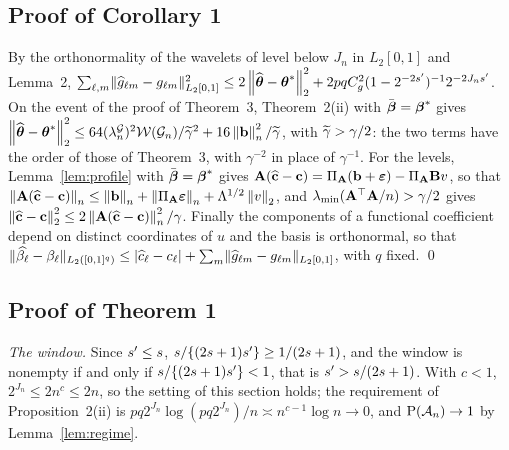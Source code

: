\subsection*{Proof of Corollary 1}

By the orthonormality of the wavelets of level below $J_n$ in $L_2[0,1]$ and
Lemma~2,
$\sum_{\ell,m}\lVert\widehat{g}_{\ell m}-g_{\ell m}\rVert^{2}_{L_2[0,1]}
\le 2\left\lVert \widehat{\boldsymbol{\theta}}-\boldsymbol{\theta}^{*} \right\rVert_{2}^{2} +
2pqC_g^{2}(1-2^{-2s'})^{-1}2^{-2J_ns'}$. On the event of the proof of
Theorem~3, Theorem~2(ii) with $\bar{\boldsymbol{\beta}} = \boldsymbol{\beta}^{*}$ gives
$\left\lVert \widehat{\boldsymbol{\theta}}-\boldsymbol{\theta}^{*} \right\rVert_{2}^{2} \le
64(\lambda^{\mathcal{G}}_{n})^{2}\mathcal{W}(\mathcal{G}_{n})/\widetilde{\gamma}^{2} + 16\left\lVert \mathbf{b} \right\rVert_{n}^{2}/\widetilde{\gamma}$, with
$\widetilde{\gamma} > \gamma/2$: the two terms have the order of those of Theorem~3, with
$\gamma^{-2}$ in place of $\gamma^{-1}$. For the levels,
Lemma~\ref{lem:profile} with $\bar{\boldsymbol{\beta}} = \boldsymbol{\beta}^{*}$ gives
$\mathbf{A}(\widehat{\mathbf{c}}-\mathbf{c}) = \Pi_{\mathbf{A}}(\mathbf{b}+\boldsymbol{\varepsilon}) - \Pi_{\mathbf{A}}\mathbf{B} v$, so that
$\left\lVert \mathbf{A}(\widehat{\mathbf{c}}-\mathbf{c}) \right\rVert_{n} \le \left\lVert \mathbf{b} \right\rVert_{n} + \left\lVert \Pi_{\mathbf{A}}\boldsymbol{\varepsilon} \right\rVert_{n} +
\Lambda^{1/2}\left\lVert v \right\rVert_{2}$, and $\lambda_{\min}(\mathbf{A}^{\top}\mathbf{A}/n) > \gamma/2$ gives
$\left\lVert \widehat{\mathbf{c}}-\mathbf{c} \right\rVert_{2}^{2} \le 2\left\lVert \mathbf{A}(\widehat{\mathbf{c}}-\mathbf{c}) \right\rVert_{n}^{2}/\gamma$. Finally the
components of a functional coefficient depend on distinct coordinates of $u$
and the basis is orthonormal, so that
$\lVert\widehat{\beta_{\ell}}-\beta_{\ell}\rVert_{L_2([0,1]^q)} \le
|\widehat{c}_{\ell}-c_{\ell}| + \sum_{m}\lVert\widehat{g}_{\ell m}-
g_{\ell m}\rVert_{L_2[0,1]}$, with $q$ fixed. \qed

\subsection*{Proof of Theorem 1}

\emph{The window.} Since $s' \le s$,
$s/\{(2s+1)s'\} \ge 1/(2s+1)$, and the window is nonempty if and only if
$s/\{(2s+1)s'\} < 1$, that is $s' > s/(2s+1)$. With $c < 1$,
$2^{J_n} \le 2n^{c} \le 2n$, so the setting of this section holds; the
requirement of Proposition~2(ii) is $pq2^{J_n}\log(pq2^{J_n})/n \asymp
n^{c-1}\log n \to 0$, and $\mathrm{P}(\mathcal{A}_{n}) \to 1$ by Lemma~\ref{lem:regime}.

